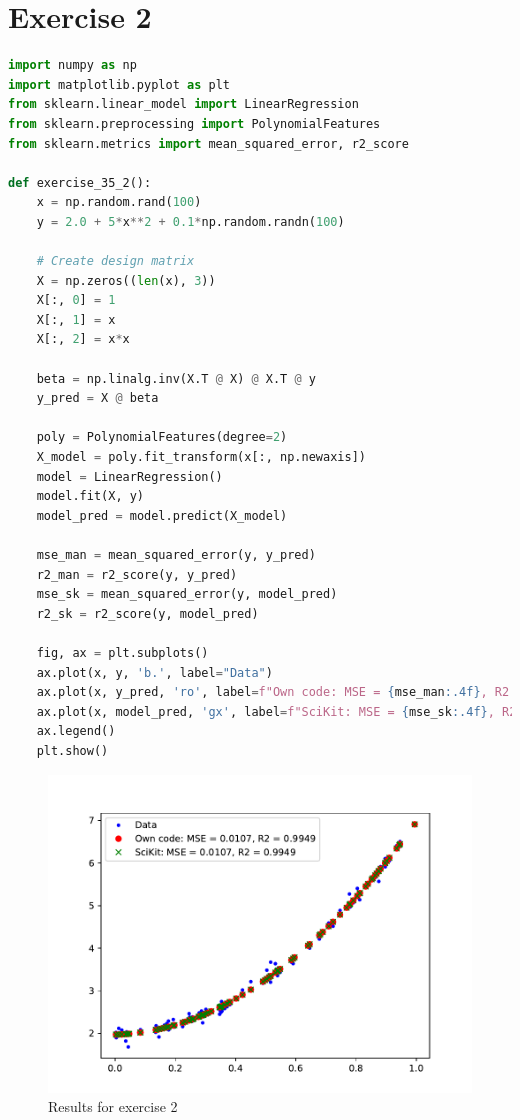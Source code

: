 \section{Exercise 2}\label{sec:ex2}
\begin{lstlisting}[language=Python]
import numpy as np
import matplotlib.pyplot as plt
from sklearn.linear_model import LinearRegression
from sklearn.preprocessing import PolynomialFeatures
from sklearn.metrics import mean_squared_error, r2_score

def exercise_35_2():
    x = np.random.rand(100)
    y = 2.0 + 5*x**2 + 0.1*np.random.randn(100)

    # Create design matrix 
    X = np.zeros((len(x), 3))
    X[:, 0] = 1
    X[:, 1] = x 
    X[:, 2] = x*x 

    beta = np.linalg.inv(X.T @ X) @ X.T @ y 
    y_pred = X @ beta

    poly = PolynomialFeatures(degree=2)
    X_model = poly.fit_transform(x[:, np.newaxis])
    model = LinearRegression()
    model.fit(X, y)
    model_pred = model.predict(X_model)

    mse_man = mean_squared_error(y, y_pred)
    r2_man = r2_score(y, y_pred)
    mse_sk = mean_squared_error(y, model_pred)
    r2_sk = r2_score(y, model_pred)
    
    fig, ax = plt.subplots()
    ax.plot(x, y, 'b.', label="Data")
    ax.plot(x, y_pred, 'ro', label=f"Own code: MSE = {mse_man:.4f}, R2 = {r2_man:.4f}")
    ax.plot(x, model_pred, 'gx', label=f"SciKit: MSE = {mse_sk:.4f}, R2 = {r2_sk:.4f}")
    ax.legend()
    plt.show()
\end{lstlisting}

\begin{figure}
    \centering
    \includegraphics[width=0.5\linewidth]{latex/figures/week35_ex2.pdf}
    \caption{Results for exercise 2}
    \label{fig:ex2}
\end{figure}

